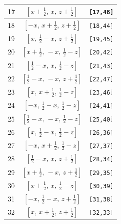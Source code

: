 \documentclass[fleqn,8pt]{jsarticle}
\begin{document}
\begin{longtable}{ccc}
17 & $\left[ x + \frac{1}{2},\, x,\, z + \frac{1}{2} \right]$ & {\tt [17,48]} \\ \hline
18 & $\left[ - x,\, x + \frac{1}{2},\, z + \frac{1}{2} \right]$ & {\tt [18,44]} \\ \hline
19 & $\left[ x,\, \frac{1}{2} - x,\, z + \frac{1}{2} \right]$ & {\tt [19,45]} \\ \hline
20 & $\left[ x + \frac{1}{2},\, - x,\, \frac{1}{2} - z \right]$ & {\tt [20,42]} \\ \hline
21 & $\left[ \frac{1}{2} - x,\, x,\, \frac{1}{2} - z \right]$ & {\tt [21,43]} \\ \hline
22 & $\left[ \frac{1}{2} - x,\, - x,\, z + \frac{1}{2} \right]$ & {\tt [22,47]} \\ \hline
23 & $\left[ x,\, x + \frac{1}{2},\, \frac{1}{2} - z \right]$ & {\tt [23,46]} \\ \hline
24 & $\left[ - x,\, \frac{1}{2} - x,\, \frac{1}{2} - z \right]$ & {\tt [24,41]} \\ \hline
25 & $\left[ \frac{1}{2} - x,\, - x,\, \frac{1}{2} - z \right]$ & {\tt [25,40]} \\ \hline
26 & $\left[ x,\, \frac{1}{2} - x,\, \frac{1}{2} - z \right]$ & {\tt [26,36]} \\ \hline
27 & $\left[ - x,\, x + \frac{1}{2},\, \frac{1}{2} - z \right]$ & {\tt [27,37]} \\ \hline
28 & $\left[ \frac{1}{2} - x,\, x,\, z + \frac{1}{2} \right]$ & {\tt [28,34]} \\ \hline
29 & $\left[ x + \frac{1}{2},\, - x,\, z + \frac{1}{2} \right]$ & {\tt [29,35]} \\ \hline
30 & $\left[ x + \frac{1}{2},\, x,\, \frac{1}{2} - z \right]$ & {\tt [30,39]} \\ \hline
31 & $\left[ - x,\, \frac{1}{2} - x,\, z + \frac{1}{2} \right]$ & {\tt [31,38]} \\ \hline
32 & $\left[ x,\, x + \frac{1}{2},\, z + \frac{1}{2} \right]$ & {\tt [32,33]} \\
\end{longtable}
\renewcommand{\arraystretch}{1.2}
\end{document}
